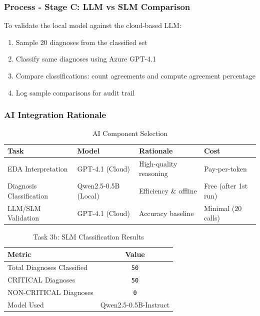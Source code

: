 \documentclass[10pt,a4paper]{article}
\begin{document}
\subsubsection{Process - Stage C: LLM vs SLM Comparison}

To validate the local model against the cloud-based LLM:

\begin{enumerate}
    \item Sample 20 diagnoses from the classified set
    \item Classify same diagnoses using Azure GPT-4.1
    \item Compare classifications: count agreements and compute agreement percentage
    \item Log sample comparisons for audit trail
\end{enumerate}

\subsubsection{AI Integration Rationale}

\begin{table}[h]
    \centering
    \caption{AI Component Selection}
    \begin{tabular}{|l|l|l|l|}
        \hline
        \textbf{Task} & \textbf{Model} & \textbf{Rationale} & \textbf{Cost} \\
        \hline
        EDA Interpretation & GPT-4.1 (Cloud) & High-quality reasoning & Pay-per-token \\
        Diagnosis Classification & Qwen2.5-0.5B (Local) & Efficiency \& offline & Free (after 1st run) \\
        LLM/SLM Validation & GPT-4.1 (Cloud) & Accuracy baseline & Minimal (20 calls) \\
        \hline
    \end{tabular}
\end{table}

\begin{table}[h]
    \centering
    \caption{Task 3b: SLM Classification Results}
    \begin{tabular}{|l|c|}
        \hline
        \textbf{Metric} & \textbf{Value} \\
        \hline
        Total Diagnoses Classified & \texttt{50} \\
        CRITICAL Diagnoses & \texttt{50} \\
        NON-CRITICAL Diagnoses & \texttt{0} \\
        Model Used & Qwen2.5-0.5B-Instruct \\
        \hline
    \end{tabular}
\end{table}
\end{document}
